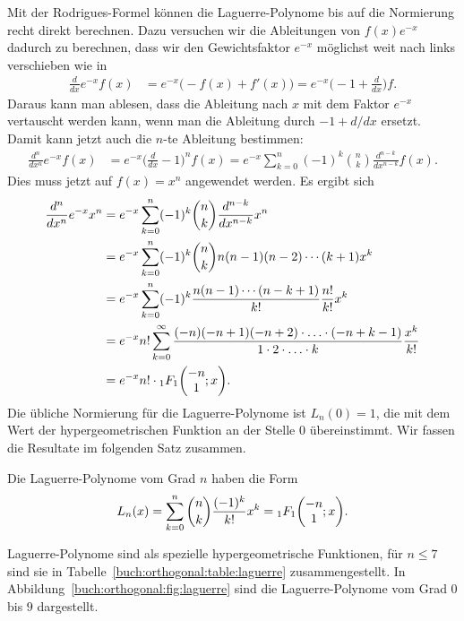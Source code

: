 Mit der Rodrigues-Formel können die Laguerre-Polynome bis auf
die Normierung recht direkt berechnen.
Dazu versuchen wir die Ableitungen von $f(x)e^{-x}$ dadurch zu
berechnen, dass wir den Gewichtsfaktor $e^{-x}$ möglichst weit
nach links verschieben wie in
\begin{align*}
\frac{d}{dx}
e^{-x}
f(x)
&=
e^{-x}
\bigl( -f(x) + f'(x) \bigr)
=
e^{-x}
\biggl( -1 + \frac{d}{dx}\biggr) f.
\end{align*}
Daraus kann man ablesen, dass die Ableitung nach $x$ mit dem Faktor
$e^{-x}$ vertauscht werden kann, wenn man die Ableitung durch
$-1+d/dx$ ersetzt.
Damit kann jetzt auch die $n$-te Ableitung bestimmen:
\begin{align*}
\frac{d^n}{dx^n}e^{-x}f(x)
&=
e^{-x} \biggl(\frac{d}{dx}-1\biggr)^n f(x)
=
e^{-x} \sum_{k=0}^n (-1)^{k}\binom{n}{k}\frac{d^{n-k}}{dx^{n-k}} f(x).
\end{align*}
Dies muss jetzt auf $f(x)=x^n$ angewendet werden.
Es ergibt sich
\begin{align*}
\frac{d^n}{dx^n}e^{-x}x^n
&=
e^{-x} \sum_{k=0}^n (-1)^{k}\binom{n}{k}\frac{d^{n-k}}{dx^{n-k}} x^n
\\
&=
e^{-x} \sum_{k=0}^n (-1)^{k}\binom{n}{k}
n(n-1)(n-2)\cdots (k+1)
x^k
\\
&=
e^{-x}
\sum_{k=0}^n (-1)^k \frac{n(n-1)\cdots(n-k+1)}{k!}
\frac{n!}{k!}
x^k
\\
&=
e^{-x} n!
\sum_{k=0}^\infty
\frac{(-n)(-n+1)(-n+2)\cdot\ldots\cdot (-n+k-1)}{1\cdot 2\cdot \ldots\cdot k}
\frac{x^k}{k!}
\\
&=
e^{-x} n!
\cdot
\mathstrut_1F_1\biggl(
\begin{matrix}-n\\1\end{matrix}; x
\biggr).
\end{align*}
Die übliche Normierung für die Laguerre-Polynome ist $L_n(0)=1$,
die mit dem Wert der hypergeometrischen Funktion an der Stelle $0$
übereinstimmt.
Wir fassen die Resultate im folgenden Satz zusammen.

\begin{satz}
%
%
Die Laguerre-Polynome vom Grad $n$ haben die Form
\begin{equation}
L_n(x)
=
\sum_{k=0}^n \binom{n}{k}\frac{(-1)^k}{k!}x^k
=
\mathstrut_1F_1\biggl(\begin{matrix}-n\\1\end{matrix};x\biggr).
\label{buch:orthogonal:eqn:laguerre-polynom-hypergeometrisch}
\end{equation}
\end{satz}
Laguerre-Polynome sind als spezielle hypergeometrische Funktionen,
für $n\le 7$ sind sie 
in Tabelle~\ref{buch:orthogonal:table:laguerre} zusammengestellt.
In Abbildung~\ref{buch:orthogonal:fig:laguerre} sind die Laguerre-Polynome
vom Grad $0$ bis $9$ dargestellt.

